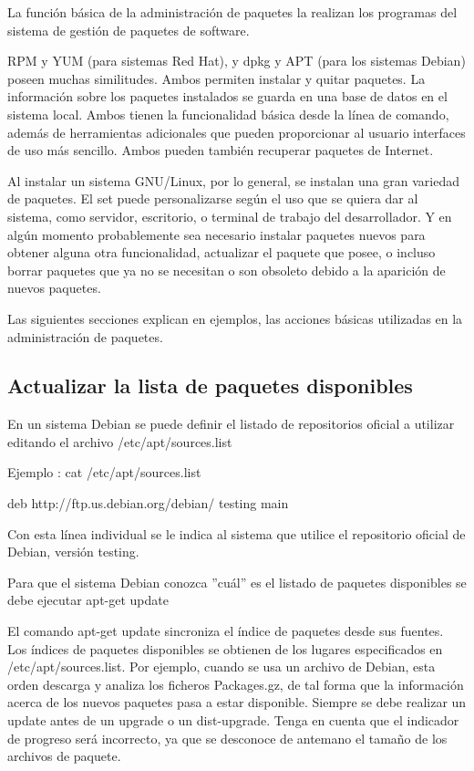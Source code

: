 \documentclass[12pt]{article}
\begin{document}
La función básica de la administración de paquetes la realizan los programas del sistema
de gestión de paquetes de software. 

RPM y YUM (para sistemas Red Hat), y dpkg y APT (para los sistemas Debian) poseen muchas similitudes. 
Ambos permiten instalar y quitar paquetes. La información sobre los paquetes instalados se guarda en una base de datos en el sistema local. Ambos tienen la funcionalidad básica desde la línea de comando, además de herramientas adicionales que pueden proporcionar al usuario interfaces de uso más sencillo. Ambos pueden también recuperar paquetes de Internet.

Al instalar un sistema GNU/Linux, por lo general, se instalan una gran variedad de paquetes. 
El set puede personalizarse según el uso que se quiera dar al sistema, como servidor, escritorio, o terminal de trabajo del desarrollador. 
Y en algún momento probablemente sea necesario instalar paquetes nuevos para obtener alguna otra funcionalidad, actualizar el paquete que posee, o incluso borrar paquetes que ya no se necesitan o son obsoleto debido a la aparición de nuevos paquetes. 

Las siguientes secciones explican en ejemplos, las acciones básicas utilizadas en la administración
de paquetes.

\subsection*{Actualizar la lista de paquetes disponibles}

En un sistema Debian se puede definir el listado de repositorios oficial a utilizar  editando el archivo /etc/apt/sources.list

Ejemplo :
cat /etc/apt/sources.list

deb http://ftp.us.debian.org/debian/ testing main

Con esta línea individual se le indica al sistema que utilice el repositorio oficial de Debian, versión testing.

Para que el sistema Debian conozca ''cuál'' es el listado de paquetes disponibles se debe ejecutar apt-get update

El comando apt-get update sincroniza el índice de paquetes desde sus
           fuentes. Los índices de paquetes disponibles se obtienen de los
           lugares especificados en /etc/apt/sources.list. Por ejemplo, cuando
           se usa un archivo de Debian, esta orden descarga y analiza los
           ficheros Packages.gz, de tal forma que la información acerca de los
           nuevos paquetes pasa a estar disponible. Siempre se debe realizar
           un update antes de un upgrade o un dist-upgrade. Tenga en cuenta
           que el indicador de progreso será incorrecto, ya que se desconoce
           de antemano el tamaño de los archivos de paquete.
\end{document}
